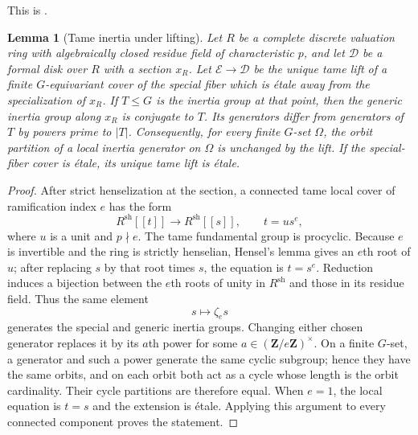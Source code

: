 \documentclass[11pt]{amsart}
\theoremstyle{plain}
\newtheorem{lemma}[theorem]{Lemma}
\theoremstyle{definition}
\numberwithin{equation}{section}
\begin{document}
This is \cite[Definition~2.13]{WewersThree}.

\begin{lemma}[Tame inertia under lifting]\label{lem:tame-profile}
Let $R$ be a complete discrete valuation ring with algebraically closed
residue field of characteristic $p$, and let $\mathcal D$ be a formal disk
over $R$ with a section $x_R$.  Let
$\mathcal E\to\mathcal D$ be the unique tame lift of a finite
$G$-equivariant cover of the special fiber which is \'etale away from the
specialization of $x_R$.  If $T\leq G$ is the inertia group at that point,
then the generic inertia group along $x_R$ is conjugate to $T$.  Its
generators differ from generators of $T$ by powers prime to $|T|$.
Consequently, for every finite $G$-set $\Omega$, the orbit partition of a
local inertia generator on $\Omega$ is unchanged by the lift.  If the
special-fiber cover is \'etale, its unique tame lift is \'etale.
\end{lemma}

\begin{proof}
After strict henselization at the section, a connected tame local cover of
ramification index $e$ has the form
\[
 R^{\mathrm{sh}}[[t]]\longrightarrow R^{\mathrm{sh}}[[s]],
 \qquad t=u s^e,
\]
where $u$ is a unit and $p\nmid e$.  The tame fundamental group is
procyclic.  Because $e$ is invertible and the ring is strictly henselian,
Hensel's lemma gives an $e$th root of $u$; after replacing $s$ by that root
times $s$, the equation is $t=s^e$.  Reduction induces a bijection between
the $e$th roots of unity in $R^{\mathrm{sh}}$ and those in its residue
field.  Thus the same element
\[
 s\longmapsto\zeta_e s
\]
generates the special and generic inertia groups.  Changing either chosen
generator replaces it by its $a$th power for some
$a\in(\mathbf Z/e\mathbf Z)^\times$.  On a finite $G$-set, a generator and
such a power generate the same cyclic subgroup; hence they have the same
orbits, and on each orbit both act as a cycle whose length is the orbit
cardinality.  Their cycle partitions are therefore equal.  When $e=1$, the
local equation is $t=s$ and the extension is \'etale.  Applying this argument
to every connected component proves the statement.
\end{proof}
\end{document}
